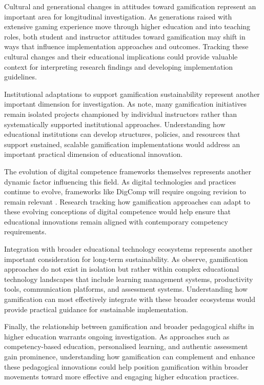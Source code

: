 \documentclass[cte]{acnsart}
\begin{document}
Cultural and generational changes in attitudes toward gamification represent an important area for longitudinal investigation. As generations raised with extensive gaming experience move through higher education and into teaching roles, both student and instructor attitudes toward gamification may shift in ways that influence implementation approaches and outcomes. Tracking these cultural changes and their educational implications could provide valuable context for interpreting research findings and developing implementation guidelines.

Institutional adaptations to support gamification sustainability represent another important dimension for investigation. As \citet{Figg20181215} note, many gamification initiatives remain isolated projects championed by individual instructors rather than systematically supported institutional approaches. Understanding how educational institutions can develop structures, policies, and resources that support sustained, scalable gamification implementations would address an important practical dimension of educational innovation.

The evolution of digital competence frameworks themselves represents another dynamic factor influencing this field. As digital technologies and practices continue to evolve, frameworks like DigComp will require ongoing revision to remain relevant \cite{Vuorikari2016}. Research tracking how gamification approaches can adapt to these evolving conceptions of digital competence would help ensure that educational innovations remain aligned with contemporary competency requirements.

Integration with broader educational technology ecosystems represents another important consideration for long-term sustainability. As \citet{Osuna-Acedo202189} observe, gamification approaches do not exist in isolation but rather within complex educational technology landscapes that include learning management systems, productivity tools, communication platforms, and assessment systems. Understanding how gamification can most effectively integrate with these broader ecosystems would provide practical guidance for sustainable implementation.

Finally, the relationship between gamification and broader pedagogical shifts in higher education warrants ongoing investigation. As approaches such as competency-based education, personalised learning, and authentic assessment gain prominence, understanding how gamification can complement and enhance these pedagogical innovations could help position gamification within broader movements toward more effective and engaging higher education practices.
\end{document}
